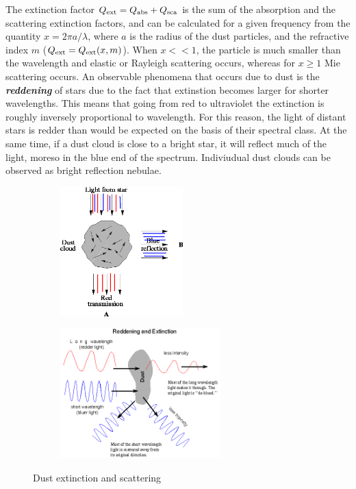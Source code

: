 The extinction factor $Q_{\rm{ext}} = Q_{\rm{abs}} + Q_{\rm{sca}}$ is the sum of the absorption and the scattering extinction factors, and can be calculated for a given frequency from the quantity $x = 2 \pi a/ \lambda$, where $a$ is the radius of the dust particles, and the refractive index $m$ ($Q_{\rm{ext}} = Q_{\rm{ext}}(x, m)$). When $x << 1$, the particle is much smaller than the wavelength and elastic or Rayleigh scattering occurs, whereas for $x \geq 1$ Mie scattering occurs. An observable phenomena that occurs due to dust is the \textbf{\textit{reddening}} of stars due to the fact that extinstion becomes larger for shorter wavelengths. This means that going from red to ultraviolet the extinction is roughly inversely proportional to wavelength. For this reason, the light of distant stars is redder than would be expected on the basis of their spectral class. At the same time, if a dust cloud is close to a bright star, it will reflect much of the light, moreso in the blue end of the spectrum. Indiviudual dust clouds can be observed as bright reflection nebulae. 

\begin{figure}[ht]
	\begin{subfigure}[t]{0.45\textwidth}
		\includegraphics[height=5cm]{img/dust1}
		\subcaption{}
		\label{fig:dust1}
	\end{subfigure}\hfill%
	\begin{subfigure}[t]{0.45\textwidth}
		\includegraphics[height=5cm]{img/dust2}
		\subcaption{}
		\label{fig:dust2}
	\end{subfigure}%
\caption{Dust extinction and scattering}
\label{fig:barnard68}
\end{figure}

